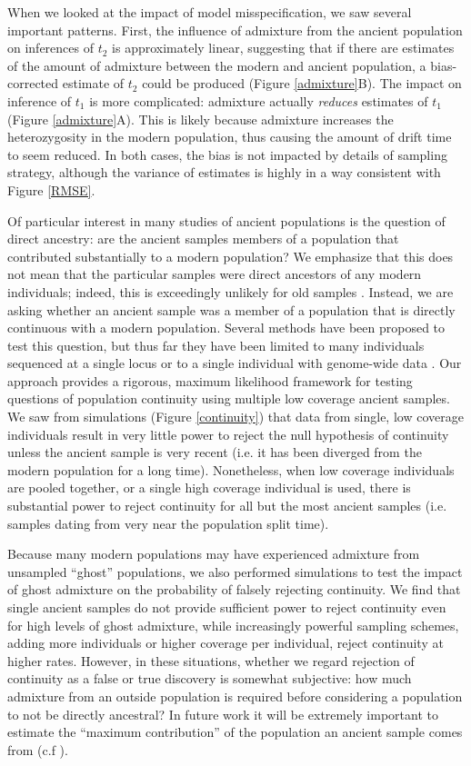 \documentclass[11pt, oneside]{article}   	%
\begin{document}
When we looked at the impact of model misspecification, we saw several important patterns. First, the influence of admixture from the ancient population on inferences of $t_2$ is approximately linear, suggesting that if there are estimates of the amount of admixture between the modern and ancient population, a bias-corrected estimate of $t_2$ could be produced (Figure \ref{admixture}B). The impact on inference of $t_1$ is more complicated: admixture actually \emph{reduces} estimates of $t_1$ (Figure \ref{admixture}A). This is likely because admixture increases the heterozygosity in the modern population, thus causing the amount of drift time to seem reduced. In both cases, the bias is not impacted by details of sampling strategy, although the variance of estimates is highly in a way consistent with Figure \ref{RMSE}. 

Of particular interest in many studies of ancient populations is the question of direct ancestry: are the ancient samples members of a population that contributed substantially to a modern population? We emphasize that this does not mean that the particular samples were direct ancestors of any modern individuals; indeed, this is exceedingly unlikely for old samples \citep{rohde2004modelling, chang1999recent, baird2003distribution, donnelly1983probability}. Instead, we are asking whether an ancient sample was a member of a population that is directly continuous with a modern population. Several methods have been proposed to test this question, but thus far they have been limited to many individuals sequenced at a single locus \citep{sjodin2014assessing} or to a single individual with genome-wide data \citep{rasmussen2014genome}. Our approach provides a rigorous, maximum likelihood framework for testing questions of population continuity using multiple low coverage ancient samples. We saw from simulations (Figure \ref{continuity}) that data from single, low coverage individuals result in very little power to reject the null hypothesis of continuity unless the ancient sample is very recent (i.e. it has been diverged from the modern population for a long time). Nonetheless, when low coverage individuals are pooled together, or a single high coverage individual is used, there is substantial power to reject continuity for all but the most ancient samples (i.e. samples dating from very near the population split time).

Because many modern populations may have experienced admixture from unsampled ``ghost'' populations, we also performed simulations to test the impact of ghost admixture on the probability of falsely rejecting continuity. We find that single ancient samples do not provide sufficient power to reject continuity even for high levels of ghost admixture, while increasingly powerful sampling schemes, adding more individuals or higher coverage per individual, reject continuity at higher rates. However, in these situations, whether we regard rejection of continuity as a false or true discovery is somewhat subjective: how much admixture from an outside population is required before considering a population to not be directly ancestral? In future work it will be extremely important to estimate the ``maximum contribution'' of the population an ancient sample comes from (c.f \citet{sjodin2014assessing}). 
\end{document}
